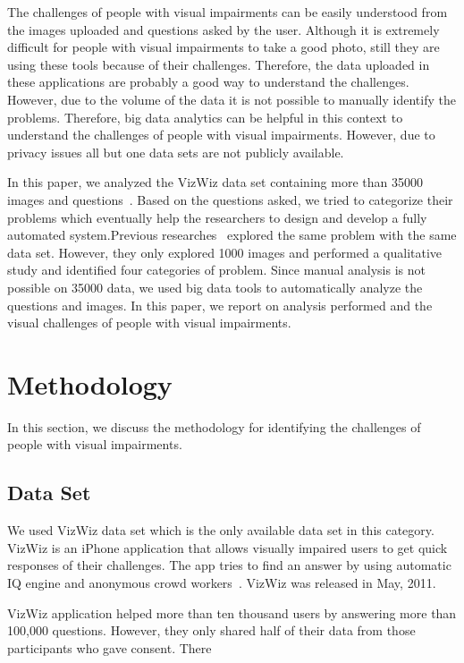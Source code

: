 \documentclass[sigconf]{acmart}
\begin{document}
The challenges of people with visual impairments can be easily understood from the images uploaded and questions asked by the user. Although it is extremely difficult for people with visual impairments to take a good photo, still they are using these tools because of their challenges. Therefore, the data uploaded in these applications are probably a good way to understand the challenges. However, due to the volume of the data it is not possible to manually identify the problems. Therefore, big data analytics can be helpful in this context to understand the challenges of people with visual impairments. However, due to privacy issues all but one data sets are not publicly available. 

In this paper, we analyzed the VizWiz data set containing more than 35000 images and questions~\cite{Bigham:2010}. Based on the questions asked, we tried to categorize their problems which eventually help the researchers to design and develop a fully automated system.Previous researches~\cite{Brady:2013} explored the same problem with the same data set. However, they only explored 1000 images and performed a qualitative study and identified four categories of problem. Since manual analysis is not possible on 35000 data, we used big data tools to automatically analyze the questions and images. In this paper, we report on analysis performed and the visual challenges of people with visual impairments.

\section{Methodology}
In this section, we discuss the methodology for identifying the challenges of people with visual impairments. 

\subsection{Data Set}
We used VizWiz data set which is the only available data set in this category. VizWiz is an iPhone application that allows visually impaired users to get quick responses of their challenges. The app tries to find an answer by using automatic IQ engine and anonymous crowd workers~\cite{vizwiz}. VizWiz was released in May, 2011. 

VizWiz application helped more than ten thousand users by answering more than 100,000 questions. However, they only shared half of their data from those participants who gave consent. There 
\end{document}
